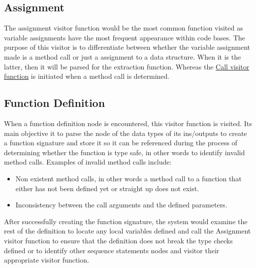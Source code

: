 \documentclass{l4proj}
\begin{document}
\subsection{Assignment}
The assignment visitor function would be the most common function visited as variable assignments have the most frequent appearance within code bases. The purpose of this visitor is to differentiate between whether the variable assignment made is a method call or just a assignment to a data structure. When it is the latter, then it will be parsed for the extraction function. Whereas the \hyperref[call]{Call visitor function} is initiated when a method call is determined. 
 
\subsection{Function Definition}
When a function definition node is encountered, this visitor function is visited. Its main objective it to parse the node of the data types of its ins/outputs to create a function signature and store it so it can be referenced during the process of determining whether the function is type safe, in other words to identify invalid method calls. Examples of invalid method calls include:
 
 \begin{itemize}
     \item Non existent method calls, in other words a method call to a function that either has not been defined yet or straight up does not exist.
     \item Inconsistency between the call arguments and the defined parameters. 
 \end{itemize}
 
 After successfully creating the function signature, the system would examine the rest of the definition to locate any local variables defined and call the Assignment visitor function to ensure that the definition does not break the type checks defined or to identify other sequence statements nodes and visitor their appropriate visitor function.
\end{document}
